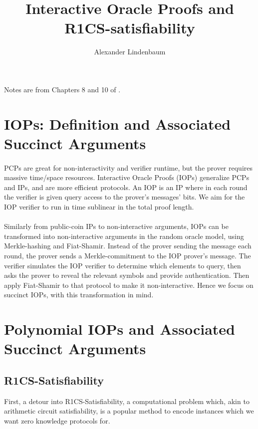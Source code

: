 \documentclass[11pt]{article}
\title{Interactive Oracle Proofs and R1CS-satisfiability}
\author{Alexander Lindenbaum}
\date{}
\begin{document}
\maketitle

Notes are from Chapters 8 and 10 of \cite{tha22}.

\section{IOPs: Definition and Associated Succinct Arguments}

\paragraph{} PCPs are great for non-interactivity and verifier runtime, but the prover requires massive time/space resources. Interactive Oracle Proofs (IOPs) generalize PCPs and IPs, and are more efficient protocols. An IOP is an IP where in each round the verifier is given query access to the prover's messages' bits. We aim for the IOP verifier to run in time sublinear in the total proof length.

\paragraph{} Similarly from public-coin IPs to non-interactive arguments, IOPs can be transformed into non-interactive arguments in the random oracle model, using Merkle-hashing and Fiat-Shamir. Instead of the prover sending the message each round, the prover sends a Merkle-commitment to the IOP prover's message. The verifier simulates the IOP verifier to determine which elements to query, then asks the prover to reveal the relevant symbols and provide authentication. Then apply Fiat-Shamir to that protocol to make it non-interactive. Hence we focus on succinct IOPs, with this transformation in mind.

\section{Polynomial IOPs and Associated Succinct Arguments}

\subsection{R1CS-Satisfiability}
First, a detour into R1CS-Satisfiability, a computational problem which, akin to arithmetic circuit satisfiability, is a popular method to encode instances which we want zero knowledge protocols for.
\end{document}
